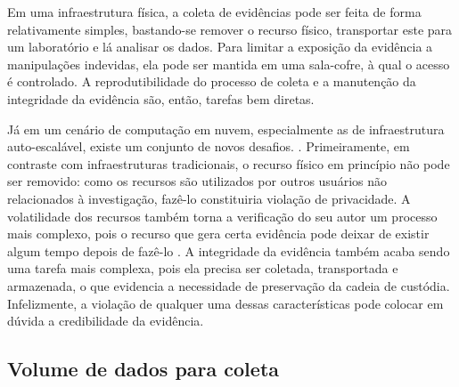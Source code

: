 Em uma infraestrutura física, a coleta de evidências pode ser feita de forma relativamente simples, bastando-se remover o recurso físico, transportar este para um laboratório e lá analisar os dados. 
%
Para limitar a exposição da evidência a manipulações indevidas, ela pode ser mantida em uma sala-cofre, à qual o acesso é controlado.
%
A reprodutibilidade do processo de coleta e a manutenção da integridade da evidência são, então, tarefas bem diretas.


Já em um cenário de computação em nuvem, especialmente as de infraestrutura auto-escalável, existe um conjunto de novos desafios. 
%
. 
Primeiramente, em contraste com infraestruturas tradicionais, o recurso físico em princípio não pode ser removido: como os recursos são utilizados por outros usuários não relacionados à investigação, fazê-lo constituiria violação de privacidade.
%
A volatilidade dos recursos também torna a verificação do seu autor um processo mais complexo, pois o recurso que gera certa evidência pode deixar de existir algum tempo depois de fazê-lo \cite{SimouCloudChlng:2014}.
%
A integridade da evidência também acaba sendo uma tarefa mais complexa, pois ela precisa ser coletada, transportada e armazenada, o que evidencia a necessidade de preservação da cadeia de custódia.
%
Infelizmente, a violação de qualquer uma dessas características pode colocar em dúvida a credibilidade da evidência.


\subsection{Volume de dados para coleta}
\label{sec:volumedados}

